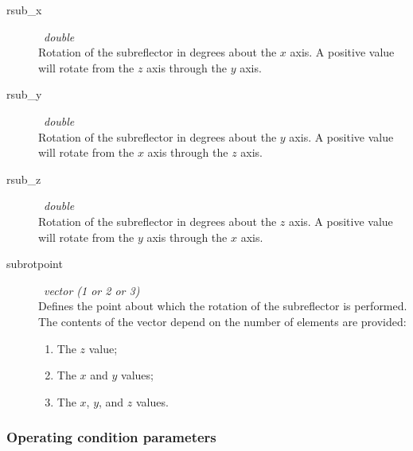 \documentclass{article}
\begin{document}
\begin{description}
\item[rsub\_x] \ {\it double} \\
Rotation of the subreflector in degrees about the $x$ axis.  A positive 
value will rotate from the $z$ axis through the $y$ axis.
\item[rsub\_y] \ {\it double} \\
Rotation of the subreflector in degrees about the $y$ axis.  A positive 
value will rotate from the $x$ axis through the $z$ axis.
\item[rsub\_z] \ {\it double} \\
Rotation of the subreflector in degrees about the $z$ axis.  A positive 
value will rotate from the $y$ axis through the $x$ axis.
\item[subrotpoint] \ {\it vector (1 or 2 or 3)} \\
Defines the point about which the rotation of the subreflector is performed.
The contents of the vector depend on the number of elements are provided:
\begin{enumerate}
\item The $z$ value;
\item The $x$ and $y$ values;
\item The $x$, $y$, and $z$ values.
\end{enumerate}
\end{description}

\subsubsection{Operating condition parameters}
\end{document}
